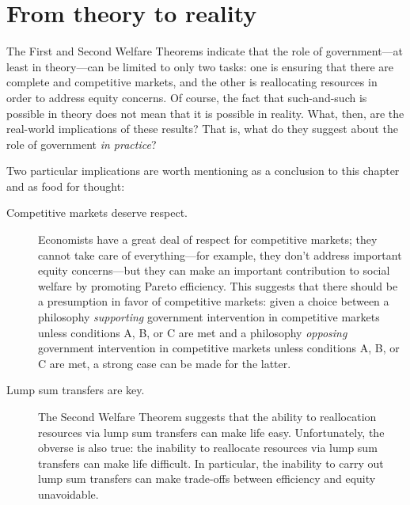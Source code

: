 \section{From theory to reality}

The First and Second Welfare Theorems indicate that the role of government---at least in theory---can be limited to only two tasks: one is ensuring that there are complete and competitive markets, and the other is reallocating resources in order to address equity concerns. Of course, the fact that such-and-such is possible in theory does not mean that it is possible in reality. What, then, are the real-world implications of these results? That is, what do they suggest about the role of government \emph{in practice}?


Two particular implications are worth mentioning as a conclusion to this chapter and as food for thought:
\begin{description}
\item[Competitive markets deserve respect.] Economists have a great deal of respect for competitive markets; they cannot take care of everything---for example, they don't address important equity concerns---but they can make an important contribution to social welfare by promoting Pareto efficiency. This suggests that there should be a presumption in favor of competitive markets: given a choice between a philosophy \emph{supporting} government intervention in competitive markets unless conditions A, B, or C are met and a philosophy \emph{opposing} government intervention in competitive markets unless conditions A, B, or C are met, a strong case can be made for the latter.
\item[Lump sum transfers are key.] The Second Welfare Theorem suggests that the ability to reallocation resources via lump sum transfers can make life easy. Unfortunately, the obverse is also true: the inability to reallocate resources via lump sum transfers can make life difficult. In particular, the inability to carry out lump sum transfers can make trade-offs between efficiency and equity unavoidable.
\end{description}

